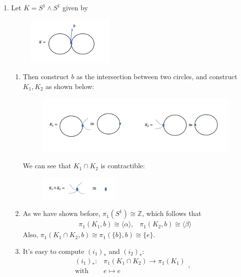 \begin{example}
\begin{enumerate}
\item
Let $K=S^1\wedge S^1$ given by
\begin{figure}[H]
\centering
\includegraphics[width=0.4\textwidth]{week15/f_36}
\end{figure}
\begin{enumerate}
\item
Then construct $b$ as the intersection between two circles, and construct $K_1,K_2$ as shown below:
\begin{figure}[H]
\centering
\includegraphics[width=\textwidth]{week15/f_37}
\end{figure}
We can see that $K_1\cap K_2$ is contractible:\begin{figure}[H]
\centering
\includegraphics[width=0.4\textwidth]{week15/f_38}
\end{figure}
\item
As we have shown before, $\pi_1(S^1)\cong\mathbb{Z}$, which follows that
\[
\begin{array}{ll}
\pi_1(K_1,b)\cong\langle\alpha\rangle,
&
\pi_1(K_2,b)\cong\langle\beta\rangle
\end{array}
\]
Also, $\pi_1(K_1\cap K_2,b)\cong\pi_1(\{b\},b)\cong\{e\}$.
\item
It's easy to compute $(i_1)_*$ and $(i_2)_*$:
\[
\begin{array}{ll}
(i_1)_*:&\pi_1(K_1\cap K_2)\to\pi_1(K_1)\\
\text{with}&e\mapsto e
\end{array},\quad
\]
\end{enumerate}
\end{enumerate}
\end{example}
